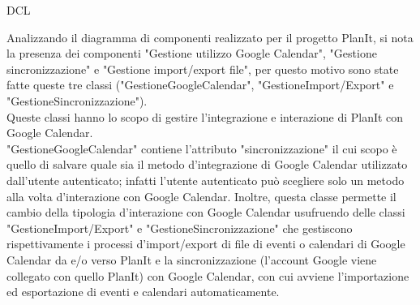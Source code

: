 \begin{listaPersonale}{DCL}
\begin{listaPersonale2}[DCL]{}
        Analizzando il diagramma di componenti realizzato per il progetto PlanIt, si nota la presenza dei componenti "Gestione utilizzo Google Calendar", "Gestione sincronizzazione" e "Gestione import/export file", per questo motivo sono state fatte queste tre classi ("GestioneGoogleCalendar", "GestioneImport/Export" e "GestioneSincronizzazione"). \\
        Queste classi hanno lo scopo di gestire l'integrazione e interazione di PlanIt con Google Calendar. \\
        "GestioneGoogleCalendar" contiene l'attributo "sincronizzazione" il cui scopo è quello di salvare quale sia il metodo d'integrazione di Google Calendar utilizzato dall'utente autenticato; infatti l'utente autenticato può scegliere solo un metodo alla volta d'interazione con Google Calendar.
        Inoltre, questa classe permette il cambio della tipologia d'interazione con Google Calendar usufruendo delle classi "GestioneImport/Export" e "GestioneSincronizzazione" che gestiscono rispettivamente i processi d'import/export di file di eventi o calendari di Google Calendar da e/o verso PlanIt e la sincronizzazione (l'account Google viene collegato con quello PlanIt) con Google Calendar, con cui avviene l'importazione ed esportazione di eventi e calendari automaticamente.


        \begin{center}
            
        \end{center}
        \newpage



\end{listaPersonale2}
\end{listaPersonale}
